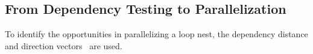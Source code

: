 








\subsection{From Dependency Testing to Parallelization}
\label{sec:fdtp}

To identify the opportunities in parallelizing a loop nest, the dependency distance and direction vectors~\cite{opac-b1000180} are used.

